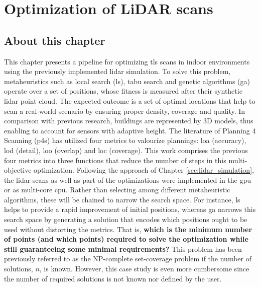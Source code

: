 \setchapterpreamble[u]{\margintoc}
\chapter{Optimization of LiDAR scans}
\label{sec:lidar_optimization}

\section*{About this chapter}

This chapter presents a pipeline for optimizing \acrshort{tls} scans in indoor environments using the previously implemented \acrshort{lidar} simulation. To solve this problem, metaheuristics such as local search (\acrshort{ls}), tabu search and genetic algorithms (\acrshort{ga}) operate over a set of positions, whose fitness is measured after their synthetic \acrshort{lidar} point cloud. The expected outcome is a set of optimal locations that help to scan a real-world scenario by ensuring proper density, coverage and quality. In comparison with previous research, buildings are represented by 3D models, thus enabling to account for sensors with adaptive height. The literature of Planning 4 Scanning (\acrshort{p4s}) has utilized four metrics to valourize plannings: \acrshort{loa} (accuracy), \acrshort{lod} (detail), \acrshort{loo} (overlap) and \acrshort{loc} (coverage). This work comprises the previous four metrics into three functions that reduce the number of steps in this multi-objective optimization. Following the approach of Chapter \ref{sec:lidar_simulation}, the \acrshort{lidar} scans as well as part of the optimizations were implemented in the \acrshort{gpu} or as multi-core \acrshort{cpu}. Rather than selecting among different metaheuristic algorithms, these will be chained to narrow the search space. For instance, \acrshort{ls} helps to provide a rapid improvement of initial positions, whereas \acrshort{ga} narrows this search space by generating a solution that encodes which positions ought to be used without distorting the metrics. That is, \textbf{which is the minimum number of points (and which points) required to solve the optimization while still guaranteeing some minimal requirements?} This problem has been previously referred to as the NP-complete set-coverage problem \cite{li_probability_2021, mohamadi_efficient_2021, roostapour_pareto_2022} if the number of solutions, $n$, is known. However, this case study is even more cumbersome since the number of required solutions is not known nor defined by the user. 

